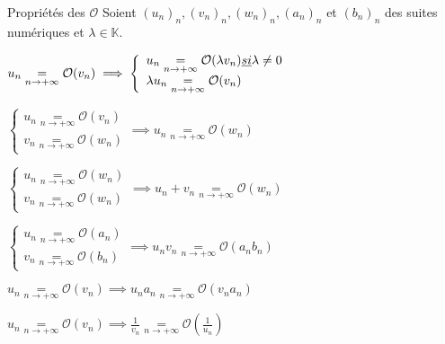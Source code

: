     \begin{theo}{Propriétés des $\mathcal{O}$}{}
        Soient $(u_n)_n, (v_n)_n, (w_n)_n, (a_n)_n$ et $(b_n)_n$ des suites numériques et $\lambda \in \mathbb{K}$.
    
        \begin{alors}
            \item $u_n \underset{n \rightarrow +\infty}{=} \mathcal{O}(v_n) \implies \left\{ \begin{array}{ll}
                u_n \underset{n \rightarrow +\infty}{=} \mathcal{O}(\lambda v_n) \emph{ si } \lambda \neq 0 \\
                \lambda u_n \underset{n \rightarrow +\infty}{=} \mathcal{O}(v_n)
            \end{array}\right.$
            \item $\left\{ \begin{array}{l}
                u_n \underset{n \rightarrow +\infty}{=} \mathcal{O}(v_n) \\
                v_n \underset{n \rightarrow +\infty}{=} \mathcal{O}(w_n)
            \end{array} \right. \implies u_n \underset{n \rightarrow +\infty}{=} \mathcal{O}(w_n)$
            \item $\left\{ \begin{array}{l}
                u_n \underset{n \rightarrow +\infty}{=} \mathcal{O}(w_n) \\
                v_n \underset{n \rightarrow +\infty}{=} \mathcal{O}(w_n)
            \end{array} \right. \implies u_n + v_n \underset{n \rightarrow +\infty}{=} \mathcal{O}(w_n)$
            \item $\left\{ \begin{array}{l}
                u_n \underset{n \rightarrow +\infty}{=} \mathcal{O}(a_n) \\
                v_n \underset{n \rightarrow +\infty}{=} \mathcal{O}(b_n)
            \end{array} \right. \implies u_n v_n \underset{n \rightarrow +\infty}{=} \mathcal{O}(a_n b_n)$
            \item $ u_n \underset{n \rightarrow +\infty}{=} \mathcal{O}(v_n) \implies u_n a_n \underset{n \rightarrow +\infty}{=} \mathcal{O}(v_n a_n)$
            \item $ u_n \underset{n \rightarrow +\infty}{=} \mathcal{O}(v_n) \implies \frac{1}{v_n} \underset{n \rightarrow +\infty}{=} \mathcal{O}\left(\frac{1}{u_n}\right)$
        \end{alors}
    \end{theo}

